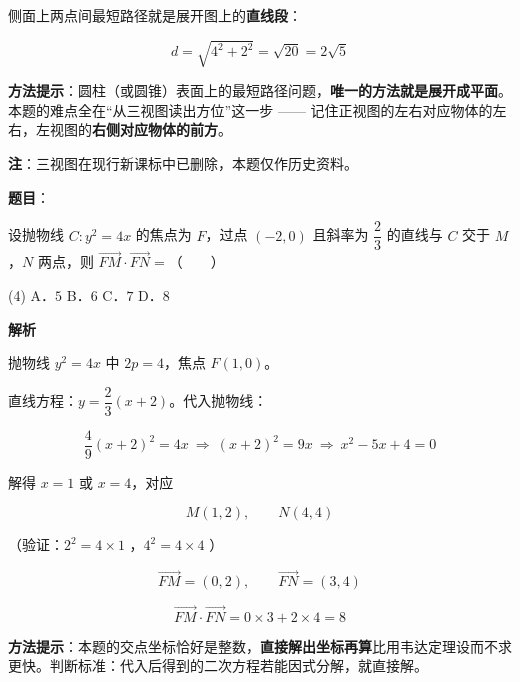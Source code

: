 \begin{answer}
侧面上两点间最短路径就是展开图上的\textbf{直线段}：

\nopagebreak[4]
\[d=\sqrt{4^{2}+2^{2}}=\sqrt{20}=2\sqrt5\]

\begin{gktip}
\textbf{方法提示}：圆柱（或圆锥）表面上的最短路径问题，\textbf{唯一的方法就是展开成平面}。本题的难点全在“从三视图读出方位”这一步 —— 记住正视图的左右对应物体的左右，左视图的\textbf{右侧对应物体的前方}。

\textbf{注}：三视图在现行新课标中已删除，本题仅作历史资料。
\end{gktip}


\par\medskip

\end{answer}
\begin{answer}

\textbf{题目}：

设抛物线 $C:y^{2}=4x$ 的焦点为 $F$，过点 $(-2,0)$ 且斜率为 $\dfrac23$ 的直线与 $C$ 交于 $M$，$N$ 两点，则 $\overrightarrow{FM}\cdot\overrightarrow{FN}=$\mbox{（　　）}

\begin{gkopts}(4)
\task A．$5$
\task B．$6$
\task C．$7$
\task D．$8$
\end{gkopts}

\textbf{解析}

抛物线 $y^{2}=4x$ 中 $2p=4$，焦点 $F(1,0)$。

直线方程：$y=\dfrac23(x+2)$。代入抛物线：

\nopagebreak[4]
\[\frac49(x+2)^{2}=4x\ \Longrightarrow\ (x+2)^{2}=9x\ \Longrightarrow\ x^{2}-5x+4=0\]

解得 $x=1$ 或 $x=4$，对应

\nopagebreak[4]
\[M(1,2),\qquad N(4,4)\]

（验证：$2^{2}=4\times1$ ，$4^{2}=4\times4$ ）

\nopagebreak[4]
\[\overrightarrow{FM}=(0,2),\qquad \overrightarrow{FN}=(3,4)\]

\nopagebreak[4]
\[\overrightarrow{FM}\cdot\overrightarrow{FN}=0\times3+2\times4=8\]

\begin{gktip}
\textbf{方法提示}：本题的交点坐标恰好是整数，\textbf{直接解出坐标再算}比用韦达定理设而不求更快。判断标准：代入后得到的二次方程若能因式分解，就直接解。
\end{gktip}


\par\medskip

\end{answer}
